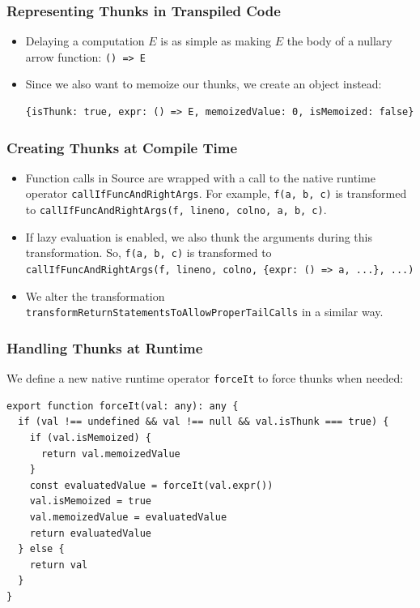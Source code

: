\documentclass[12pt]{beamer}
\begin{document}
\begin{frame}[fragile]
\frametitle{Representing Thunks in Transpiled Code}
\begin{itemize}
\item<1-> Delaying a computation $E$ is as simple as making $E$ the body of a nullary arrow function: \texttt{() => E}

\item<2-> Since we also want to memoize our thunks, we create an object instead:
\begin{lstlisting}
{isThunk: true, expr: () => E, memoizedValue: 0, isMemoized: false}
\end{lstlisting}
\end{itemize}
\end{frame}

\begin{frame}
\frametitle{Creating Thunks at Compile Time}
\begin{itemize}
\item<1-> Function calls in Source are wrapped with a call to the native runtime operator \texttt{callIfFuncAndRightArgs}. For example, \texttt{f(a, b, c)} is transformed to \texttt{callIfFuncAndRightArgs(f, lineno, colno, a, b, c)}.
\item<2-> If lazy evaluation is enabled, we also thunk the arguments during this transformation. So, \texttt{f(a, b, c)} is transformed to \texttt{callIfFuncAndRightArgs(f, lineno, colno, \{expr: () => a, ...\}, ...)}
\item<3-> We alter the transformation \texttt{transformReturnStatementsToAllowProperTailCalls} in a similar way.
\end{itemize}
\end{frame}

\begin{frame}[fragile]
\frametitle{Handling Thunks at Runtime}
We define a new native runtime operator \texttt{forceIt} to force thunks when needed:
\begin{lstlisting}
export function forceIt(val: any): any {
  if (val !== undefined && val !== null && val.isThunk === true) {
    if (val.isMemoized) {
      return val.memoizedValue
    }
    const evaluatedValue = forceIt(val.expr())
    val.isMemoized = true
    val.memoizedValue = evaluatedValue
    return evaluatedValue
  } else {
    return val
  }
}
\end{lstlisting}
\end{frame}
\end{document}
